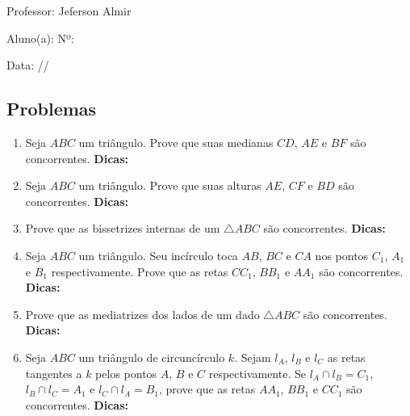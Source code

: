 \documentclass{article}
\newcommand{\dica}{\textbf{Dicas:}}
\begin{document}
\begin{center}
Professor: Jeferson Almir
\end{center}

Aluno(a): \underline{\hspace{12cm}}
Nº: \underline{\hspace{2cm}}

Data: \underline{\hspace{2cm}}/\underline{\hspace{2cm}}/\underline{\hspace{2cm}}

\begin{multicols}{2}

\section{Problemas}

\renewcommand{\labelenumi}{\textbf{\arabic{enumi}.}}
\renewcommand\labelenumi{\textbf{\nplpadding{3}\numprint{\arabic{enumi}}.}}

\begin{enumerate}

    \item Seja $ABC$ um triângulo. Prove que suas medianas $CD$, $AE$ e $BF$ são concorrentes. \dica %
    
    \item Seja $ABC$ um triângulo. Prove que suas alturas $AE$, $CF$ e $BD$ são concorrentes. \dica %
    
    \item Prove que as bissetrizes internas de um $\triangle ABC$ são concorrentes. \dica %
    
    \item Seja $ABC$ um triângulo. Seu incírculo toca $AB$, $BC$ e $CA$ nos pontos $C_1$, $A_1$ e $B_1$ respectivamente. Prove que as retas $CC_1$, $BB_1$ e $AA_1$ são concorrentes. \dica %
    
    \item Prove que as mediatrizes dos lados de um dado $\triangle ABC$ são concorrentes. \dica %
    
    \item Seja $ABC$ um triângulo de circuncírculo $k$. Sejam $l_A$, $l_B$ e $l_C$ as retas tangentes a $k$ pelos pontos $A$, $B$ e $C$ respectivamente. Se $l_A\cap l_B=C_1$, $l_B\cap l_C=A_1$ e $l_C\cap l_A=B_1$, prove que as retas $AA_1$, $BB_1$ e $CC_1$ são concorrentes. \dica %
    

\end{enumerate}
\end{multicols}
\end{document}
